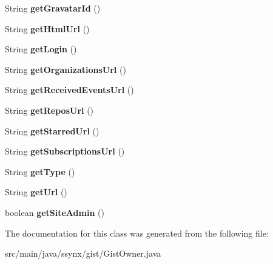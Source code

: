 \begin{DoxyCompactItemize}
\item 
\mbox{\label{classssynx_1_1gist_1_1GistOwner_a50ef0d853fefaed78590d53ca67d7ccf}} 
String {\bfseries get\+Gravatar\+Id} ()
\item 
\mbox{\label{classssynx_1_1gist_1_1GistOwner_aa6fe5529fbcfdbb77312e968c494332e}} 
String {\bfseries get\+Html\+Url} ()
\item 
\mbox{\label{classssynx_1_1gist_1_1GistOwner_a921be6e0e57ffe657d6eca19806001ec}} 
String {\bfseries get\+Login} ()
\item 
\mbox{\label{classssynx_1_1gist_1_1GistOwner_a2ee1e3716d92699ac7c70317fe4b13aa}} 
String {\bfseries get\+Organizations\+Url} ()
\item 
\mbox{\label{classssynx_1_1gist_1_1GistOwner_a91fe9cd54c124b48527ddb3796998a0a}} 
String {\bfseries get\+Received\+Events\+Url} ()
\item 
\mbox{\label{classssynx_1_1gist_1_1GistOwner_ae1b1b2b108450ba32d0104441ce99c6e}} 
String {\bfseries get\+Repos\+Url} ()
\item 
\mbox{\label{classssynx_1_1gist_1_1GistOwner_a62485476023e746b32b62b940be71499}} 
String {\bfseries get\+Starred\+Url} ()
\item 
\mbox{\label{classssynx_1_1gist_1_1GistOwner_a0f6212cfe301856976c4cad2e6c4b5be}} 
String {\bfseries get\+Subscriptions\+Url} ()
\item 
\mbox{\label{classssynx_1_1gist_1_1GistOwner_a1beca44a605a0fde489ea3bdda975c71}} 
String {\bfseries get\+Type} ()
\item 
\mbox{\label{classssynx_1_1gist_1_1GistOwner_ae9cec894387e5ea0c90e98178f0af94f}} 
String {\bfseries get\+Url} ()
\item 
\mbox{\label{classssynx_1_1gist_1_1GistOwner_ab7058059cea55f07d3456806ebc51ef5}} 
boolean {\bfseries get\+Site\+Admin} ()
\end{DoxyCompactItemize}


The documentation for this class was generated from the following file\+:\begin{DoxyCompactItemize}
\item 
src/main/java/ssynx/gist/Gist\+Owner.\+java\end{DoxyCompactItemize}
